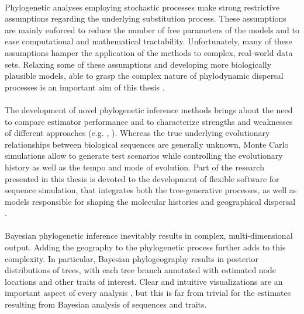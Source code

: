 \paragraph{}
Phylogenetic analyses employing stochastic processes make strong restrictive assumptions regarding the underlying substitution process.
These assumptions are mainly enforced to reduce the number of free parameters of the models and to ease computational and mathematical tractability.
Unfortunately, many of these assumptions hamper the application of the methods to complex, real-world data sets.
Relaxing some of these assumptions and developing more biologically plausible models, able to grasp the complex nature of phylodynamic dispersal processes is an important aim of this thesis \citep{Bielejec2014a}.

\paragraph{}
The development of novel phylogenetic inference methods brings about the need to compare estimator performance and to characterize strengths and weaknesses of different approaches (e.g. \cite{Arenas2012}, \cite{Hoban2011}).
Whereas the true underlying evolutionary relationships between biological sequences are generally unknown, Monte Carlo simulations allow to generate test scenarios while controlling the evolutionary history as well as the tempo and mode of evolution. 
Part of the research presented in this thesis is devoted to the development of flexible software for sequence simulation, that integrates both the tree-generative processes, as well as models responsible for shaping the molecular histories and geographical dispersal \citep{Bielejec2014a}.

\paragraph{}
Bayesian phylogenetic inference inevitably results in complex, multi-dimensional output.
Adding the geography to the phylogenetic process further adds to this complexity.
In particular, Bayesian phylogeography results in posterior distributions of trees, with each tree branch annotated with estimated node locations and other traits of interest.
Clear and intuitive visualizations are an important aspect of every analysis \citep{Hadley2010}, but this is far from trivial for the estimates resulting from Bayesian analysis of sequences and traits.

